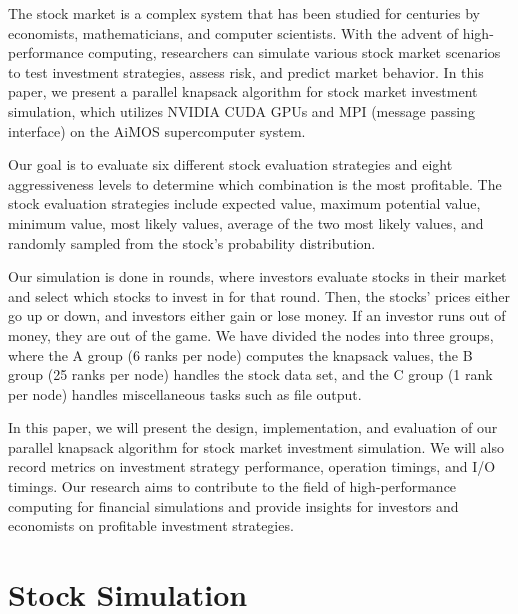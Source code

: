 \documentclass[conference]{IEEEtran}
\begin{document}
The stock market is a complex system that has been studied for centuries by economists, mathematicians, and computer scientists. With the advent of high-performance computing, researchers can simulate various stock market scenarios to test investment strategies, assess risk, and predict market behavior. In this paper, we present a parallel knapsack algorithm for stock market investment simulation, which utilizes NVIDIA CUDA GPUs and MPI (message passing interface) on the AiMOS supercomputer system.

Our goal is to evaluate six different stock evaluation strategies and eight aggressiveness levels to determine which combination is the most profitable. The stock evaluation strategies include expected value, maximum potential value, minimum value, most likely values, average of the two most likely values, and randomly sampled from the stock's probability distribution.

Our simulation is done in rounds, where investors evaluate stocks in their market and select which stocks to invest in for that round. Then, the stocks' prices either go up or down, and investors either gain or lose money. If an investor runs out of money, they are out of the game. We have divided the nodes into three groups, where the A group (6 ranks per node) computes the knapsack values, the B group (25 ranks per node) handles the stock data set, and the C group (1 rank per node) handles miscellaneous tasks such as file output.

In this paper, we will present the design, implementation, and evaluation of our parallel knapsack algorithm for stock market investment simulation. We will also record metrics on investment strategy performance, operation timings, and I/O timings. Our research aims to contribute to the field of high-performance computing for financial simulations and provide insights for investors and economists on profitable investment strategies.

\section{Stock Simulation}
\label{sec:stock simulation}
\end{document}
